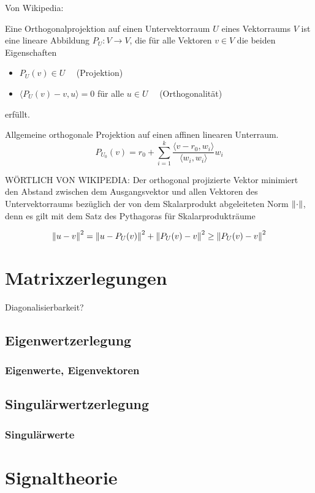 Von Wikipedia:
\begin{defn}
Eine Orthogonalprojektion auf einen Untervektorraum $U$ eines Vektorraums $V$ ist eine lineare Abbildung $P_U \colon V \rightarrow V$, die für alle Vektoren $v\in V$ die beiden Eigenschaften

\begin{itemize}
\item $P_U(v) \in U \quad$   (Projektion)
\item $\langle P_U(v) - v , u \rangle = 0$ für alle $u \in U \quad$ (Orthogonalität)
\end{itemize}
erfüllt.
\end{defn}

Allgemeine orthogonale Projektion auf einen affinen linearen Unterraum.
$$P_{U_0}(v) = r_0 + \sum_{i=1}^k \frac{\langle v - r_0, w_i \rangle}{\langle w_i, w_i \rangle} w_i$$

WÖRTLICH VON WIKIPEDIA:
Der orthogonal projizierte Vektor minimiert den Abstand zwischen dem Ausgangsvektor und allen Vektoren des Untervektorraums bezüglich der von dem Skalarprodukt abgeleiteten Norm $\left\lVert \cdot \right\rVert$, denn es gilt mit dem Satz des Pythagoras für Skalarprodukträume

$$\left\lVert u - v \right\rVert^2 = \left\lVert u - P_U(v) \right\rVert^2 + \left\lVert P_U(v) - v \right\rVert^2 \geq \left\lVert P_U(v) - v \right\rVert^2$$

\section{Matrixzerlegungen}

Diagonalisierbarkeit?

\subsection{Eigenwertzerlegung}
\subsubsection{Eigenwerte, Eigenvektoren}
\subsection{Singulärwertzerlegung}
\subsubsection{Singulärwerte}

\section{Signaltheorie}

